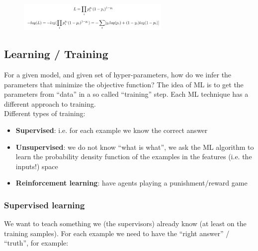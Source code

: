 \begin{figure}[h]
	\centering
	\includegraphics[width=0.65\textwidth]{figure_ml/L_bce.png}
\end{figure}
\FloatBarrier

\subsection{Learning / Training}
For a given model, and given set of hyper-parameters, how do we infer the parameters that minimize the objective function? The idea of ML is to get the parameters from “data” in a so called “training” step. Each ML technique has a different approach to training.\\
Different types of training:
\begin{itemize}
	\item \textbf{Supervised}: i.e. for each example we know the correct answer
	\item \textbf{Unsupervised}: we do not know “what is what”, we ask the ML algorithm to learn the probability density function of the examples in the features (i.e. the inputs!) space
	\item \textbf{Reinforcement learning}: have agents playing a punishment/reward game
\end{itemize}

\subsubsection{Supervised learning}

We want to teach something we (the supervisors) already know (at least on the training samples). For each example we need to have the “right answer” / “truth”, for example:


